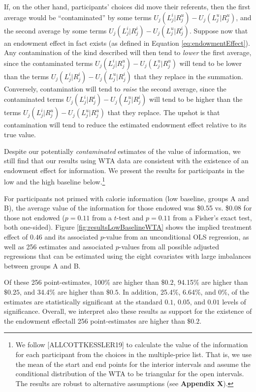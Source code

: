 \documentclass[12pt]{article}
\begin{document}
If, on the other hand, participants' choices did move their referents, then the first average would be \enquote{contaminated} by some terms $U_j(L_j^i|R_j^u)-U_j(L_j^u|R_j^u)$, and the second average by some terms $U_j(L_j^i|R_j^i)-U_j(L_j^u|R_j^i)$. Suppose now that an endowment effect in fact exists (as defined in Equation \ref{eq:endowmentEffect}). Any contamination of the kind described will then tend to \emph{lower} the first average, since the contaminated terms $U_j(L_j^i|R_j^u)-U_j(L_j^u|R_j^u)$ will tend to be lower than the terms $U_j(L_j^i|R_j^i)-U_j(L_j^u|R_j^i)$ that they replace in the summation. Conversely, contamination will tend to \emph{raise} the second average, since the contaminated terms $U_j(L_j^i|R_j^i)-U_j(L_j^u|R_j^i)$ will tend to be higher than the terms $U_j(L_j^i|R_j^u)-U_j(L_j^u|R_j^u)$ that they replace. The upshot is that contamination will tend to reduce the estimated endowment effect relative to its true value.

Despite our potentially \emph{contaminated} estimates of the value of information, we still find that our results using WTA data are consistent with the existence of an endowment effect for information. We present the results for participants in the low and the high baseline below.\footnote{We follow [ALLCOTTKESSLER19] to calculate the value of the information for each participant from the choices in the multiple-price list. That is, we use the mean of the start and end points for the interior intervals and assume the conditional distribution of the WTA to be triangular for the open intervals. The results are robust to alternative assumptions (see \textbf{Appendix X}).}

For participants not primed with calorie information (low baseline, groups A and B), the average value of the information for those endowed was \$0.55 vs. \$0.08 for those not endowed ($p=0.11$ from a $t$-test and $p=0.11$ from a Fisher's exact test, both one-sided). Figure \ref{fig:resultsLowBaselineWTA} shows the implied treatment effect of $0.46$ and its associated $p$-value from an unconditional OLS regression, as well as 256 estimates and associated $p$-values from all possible adjusted regressions that can be estimated using the eight covariates with large imbalances between groups A and B.

Of these 256 point-estimates, 100\% are higher than $\$0.2$, 94.15\% are higher than $\$0.25$, and 34.4\% are higher than $\$0.5$. In addition, 25.4\%, 6.64\%, and 0\%, of the estimates are statistically significant at the standard $0.1$, $0.05$, and $0.01$ levels of significance. Overall, we interpret also these results as support for the existence of the endowment effect\textemdash all 256 point-estimates are higher than $\$0.2$.
\end{document}
